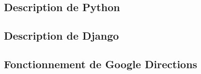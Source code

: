 \documentclass[12pt, a4paper, oneside]{article}
\begin{document}
\subsection{Description de Python}
\subsection{Description de Django}
\subsection{Fonctionnement de Google Directions}
\end{document}
